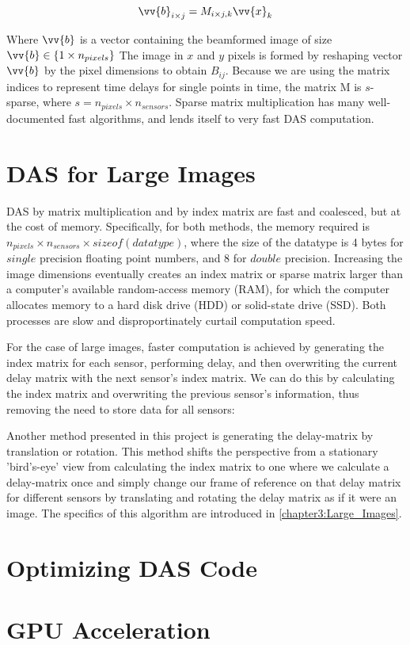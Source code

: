 \begin{equation}
    \vv{b}_{i \times j} = M_{i\times j, k}\vv{x}_{k}
\end{equation}

Where $\vv{b}$ is a vector containing the beamformed image of size $\vv{b} \in \{1 \times n_{pixels}\}$ The image in $x$ and $y$ pixels is formed by reshaping vector $\vv{b}$ by the pixel dimensions to obtain $B_{ij}$. Because we are using the matrix indices to represent time delays for single points in time, the matrix M is $s$-sparse, where $s = n_{pixels}\times n_{sensors}$. Sparse matrix multiplication has many well-documented fast algorithms, and lends itself to very fast DAS computation.

\section{DAS for Large Images}
\label{chapter2:large_images}

DAS by matrix multiplication and by index matrix are fast and coalesced, but at the cost of memory. Specifically, for both methods, the memory required is $n_{pixels}\times n_{sensors} \times sizeof(datatype)$, where the size of the datatype is 4 bytes for $single$ precision floating point numbers, and 8 for $double$ precision. Increasing the image dimensions eventually creates an index matrix or sparse matrix larger than a computer's available random-access memory (RAM), for which the computer allocates memory to a hard disk drive (HDD) or solid-state drive (SSD). Both processes are slow and disproportinately curtail computation speed.

For the case of large images, faster computation is achieved by generating the index matrix for each sensor, performing delay, and then overwriting the current delay matrix with the next sensor's index matrix. We can do this by calculating the index matrix and overwriting the previous sensor's information, thus removing the need to store data for all sensors:

Another method presented in this project is generating the delay-matrix by translation or rotation. This method shifts the perspective from a stationary 'bird's-eye' view from calculating the index matrix to one where we calculate a delay-matrix once and simply change our frame of reference on that delay matrix for different sensors by translating and rotating the delay matrix as if it were an image. The specifics of this algorithm are introduced in \ref{chapter3:Large_Images}.

\section{Optimizing DAS Code}
\label{chapter2:optimizing}



\section{GPU Acceleration}
\label{chapter2:gpu_accel}

